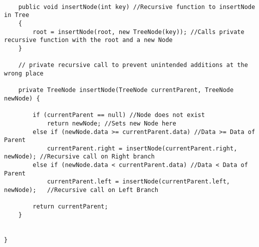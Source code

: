 \documentclass[ProgramminAssignment.tex]{subfiles}
\begin{document}
\begin{lstlisting}
	
	public void insertNode(int key) //Recursive function to insertNode in Tree
	{
	    root = insertNode(root, new TreeNode(key));	//Calls private recursive function with the root and a new Node
	}

	// private recursive call to prevent unintended additions at the wrong place

	private TreeNode insertNode(TreeNode currentParent, TreeNode newNode) {

	    if (currentParent == null) //Node does not exist
	        return newNode;	//Sets new Node here
	    else if (newNode.data >= currentParent.data) //Data >= Data of Parent
	        currentParent.right = insertNode(currentParent.right, newNode);	//Recursive call on Right branch
	    else if (newNode.data < currentParent.data) //Data < Data of Parent
	        currentParent.left = insertNode(currentParent.left, newNode);	//Recursive call on Left Branch

	    return currentParent;
	}
	
	
}

\end{lstlisting}
\end{document}
